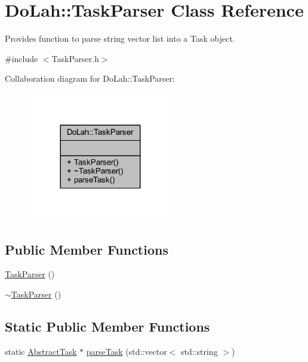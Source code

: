 \hypertarget{class_do_lah_1_1_task_parser}{}\section{Do\+Lah\+:\+:Task\+Parser Class Reference}
\label{class_do_lah_1_1_task_parser}


Provides function to parse string vector list into a Task object.  




{\ttfamily \#include $<$Task\+Parser.\+h$>$}



Collaboration diagram for Do\+Lah\+:\+:Task\+Parser\+:\nopagebreak
\begin{figure}[H]
\begin{center}
\leavevmode
\includegraphics[width=180pt]{class_do_lah_1_1_task_parser__coll__graph}
\end{center}
\end{figure}
\subsection*{Public Member Functions}
\begin{DoxyCompactItemize}
\item 
\hyperlink{class_do_lah_1_1_task_parser_a26ab75a0af21222999d7c9403c773e3c}{Task\+Parser} ()
\item 
\hyperlink{class_do_lah_1_1_task_parser_ab4629041696946f0ff427d92fede13d2}{$\sim$\+Task\+Parser} ()
\end{DoxyCompactItemize}
\subsection*{Static Public Member Functions}
\begin{DoxyCompactItemize}
\item 
static \hyperlink{class_do_lah_1_1_abstract_task}{Abstract\+Task} $\ast$ \hyperlink{class_do_lah_1_1_task_parser_af3d4283f31c89089418381e737db41f1}{parse\+Task} (std\+::vector$<$ std\+::string $>$)
\end{DoxyCompactItemize}


